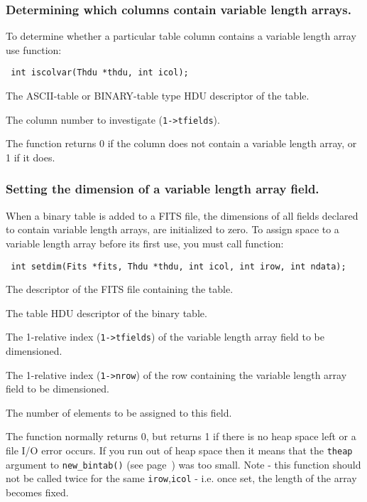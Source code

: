 \subsubsection{Determining which columns contain variable length arrays.}
To determine whether a particular table column contains a variable
length array use function:

\label{iscolvar}\begin{verbatim}
 int iscolvar(Thdu *thdu, int icol);
\end{verbatim}

\begin{arglist}
 The ASCII-table or BINARY-table type HDU descriptor of
                   the table.

 The column number to investigate (\verb`1->tfields`).
\end{arglist}

The function returns 0 if the column does not contain a variable
length array, or 1 if it does.

\subsubsection{Setting the dimension of a variable length array field.}
When a binary table is added to a FITS file, the dimensions of all
fields declared to contain variable length arrays, are initialized to
zero. To assign space to a variable length array before its first use,
you must call function: 
\label{setdim}\begin{verbatim}
 int setdim(Fits *fits, Thdu *thdu, int icol, int irow, int ndata);
\end{verbatim}

\begin{arglist}

 The descriptor of the FITS file containing the table.
 
 The table HDU descriptor of the binary table.

 The 1-relative index (\verb`1->tfields`) of the
             variable length array field to be dimensioned.

 The 1-relative index (\verb`1->nrow`) of the row containing
             the variable length array field to be dimensioned.

 The number of elements to be assigned to this field.
\end{arglist}

The function normally returns 0, but returns 1 if there is no heap
space left or a file I/O error occurs. If you run out of heap space
then it means that the \verb`theap` argument to \verb`new_bintab()`
(see page~\pageref{new_bintab}) was too small. Note - this function
should not be called twice for the same 
\verb`irow`,\verb`icol` - i.e. once set, the length of the array
becomes fixed. 

